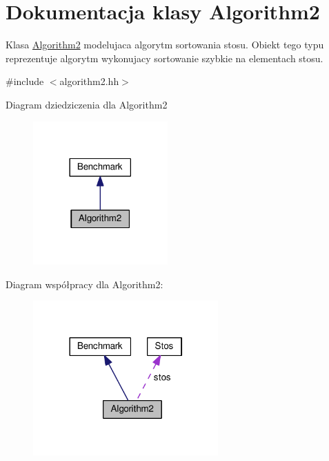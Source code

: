 \hypertarget{class_algorithm2}{\section{Dokumentacja klasy Algorithm2}
\label{class_algorithm2}
}


Klasa \hyperlink{class_algorithm2}{Algorithm2} modelujaca algorytm sortowania stosu. Obiekt tego typu reprezentuje algorytm wykonujacy sortowanie szybkie na elementach stosu.  




{\ttfamily \#include $<$algorithm2.\-hh$>$}



Diagram dziedziczenia dla Algorithm2\nopagebreak
\begin{figure}[H]
\begin{center}
\leavevmode
\includegraphics[width=146pt]{class_algorithm2__inherit__graph}
\end{center}
\end{figure}


Diagram współpracy dla Algorithm2\-:\nopagebreak
\begin{figure}[H]
\begin{center}
\leavevmode
\includegraphics[width=201pt]{class_algorithm2__coll__graph}
\end{center}
\end{figure}
